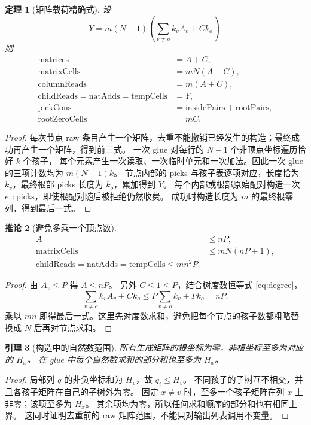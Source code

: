 \documentclass[UTF8,11pt,a4paper]{ctexart}
\newtheorem{theorem}{定理}[section]
\newtheorem{lemma}[theorem]{引理}
\newtheorem{corollary}[theorem]{推论}
\theoremstyle{definition}
\begin{document}
\begin{theorem}[矩阵载荷精确式]\label{thm:matrix}
设
\[
 Y=m(N-1)\left(\sum_{v\ne o}k_v A_v+Ck_o\right).
\]
则
\begin{align*}
 \mathrm{matrices}&=A+C,\\
 \mathrm{matrixCells}&=mN(A+C),\\
 \mathrm{columnReads}&=m(A+C),\\
 \mathrm{childReads}=\mathrm{natAdds}=\mathrm{tempCells}&=Y,\\
 \mathrm{pickCons}&=\mathrm{insidePairs}+\mathrm{rootPairs},\\
 \mathrm{rootZeroCells}&=mC.
\end{align*}
\end{theorem}
\begin{proof}
每次节点 raw 条目产生一个矩阵，去重不能撤销已经发生的构造；最终成功再产生一个矩阵，得到前三式。
一次 glue 对每行的 $N-1$ 个非顶点坐标遍历恰好 $k$ 个孩子，
每个元素产生一次读取、一次临时单元和一次加法。因此一次 glue 的三项计数均为 $m(N-1)k$。
节点内部的 picks 与孩子表逐项对应，长度恰为 $k_v$，最终根部 picks 长度为 $k_o$，累加得到 $Y$。
每个内部或根部原始配对构造一次 $e::\mathrm{picks}$，即使根配对随后被拒绝仍然收费。
成功时构造长度为 $m$ 的最终根零列，得到最后一式。
\end{proof}

\begin{corollary}[避免多乘一个顶点数]\label{cor:payload}
\begin{align*}
 A&\le nP,\\
 \mathrm{matrixCells}&\le mN(nP+1),\\
 \boxed{\mathrm{childReads}=\mathrm{natAdds}=\mathrm{tempCells}
   \le mn^2P.}
\end{align*}
\end{corollary}
\begin{proof}
由 $A_v\le P$ 得 $A\le nP$。
另外 $C\le1\le P$，结合树度数恒等式 \eqref{eq:degree}，
\[
 \sum_{v\ne o}k_vA_v+Ck_o
 \le P\sum_{v\ne o}k_v+Pk_o=nP.
\]
乘以 $mn$ 即得最后一式。这里先对度数求和，避免把每个节点的孩子数都粗略替换成 $N$ 后再对节点求和。
\end{proof}

\begin{lemma}[构造中的自然数范围]
所有生成矩阵的根坐标为零，非根坐标至多为对应的 $H_x$。
在 glue 中每个自然数求和的部分和也至多为 $H_x$。
\end{lemma}
\begin{proof}
局部列 $q$ 的非负坐标和为 $H_v$，故 $q_i\le H_v$。
不同孩子的子树互不相交，并且各孩子矩阵在自己的子树外为零。
固定 $x\ne v$ 时，至多一个孩子矩阵在列 $x$ 上非零；该项至多为 $H_x$。
其余项均为零，所以任何求和顺序的部分和也有相同上界。
这同时证明去重前的 raw 矩阵范围，不能只对输出列表调用不变量。
\end{proof}
\end{document}
